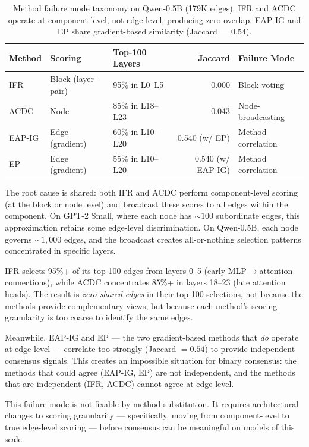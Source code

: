\documentclass[11pt,a4paper]{article}
\begin{document}
\begin{table}[t]
\centering
\small
\caption{Method failure mode taxonomy on Qwen-0.5B (179K edges). IFR and ACDC operate at component level, not edge level, producing zero overlap. EAP-IG and EP share gradient-based similarity (Jaccard $= 0.54$).}
\label{tab:divergence}
\begin{tabular}{lllrl}
\toprule
\textbf{Method} & \textbf{Scoring} & \textbf{Top-100 Layers} & \textbf{Jaccard} & \textbf{Failure Mode} \\
\midrule
IFR    & Block (layer-pair) & 95\% in L0--L5    & 0.000 & Block-voting \\
ACDC   & Node               & 85\% in L18--L23  & 0.043 & Node-broadcasting \\
EAP-IG & Edge (gradient)    & 60\% in L10--L20  & 0.540 (w/ EP) & Method correlation \\
EP     & Edge (gradient)    & 55\% in L10--L20  & 0.540 (w/ EAP-IG) & Method correlation \\
\bottomrule
\end{tabular}
\end{table}

The root cause is shared: both IFR and ACDC perform component-level scoring (at the block or node level) and broadcast these scores to all edges within the component. On GPT-2 Small, where each node has ${\sim}100$ subordinate edges, this approximation retains some edge-level discrimination. On Qwen-0.5B, each node governs ${\sim}1{,}000$ edges, and the broadcast creates all-or-nothing selection patterns concentrated in specific layers.

IFR selects 95\%+ of its top-100 edges from layers 0--5 (early MLP$\to$attention connections), while ACDC concentrates 85\%+ in layers 18--23 (late attention heads). The result is \emph{zero shared edges} in their top-100 selections, not because the methods provide complementary views, but because each method's scoring granularity is too coarse to identify the same edges.

Meanwhile, EAP-IG and EP --- the two gradient-based methods that \emph{do} operate at edge level --- correlate too strongly (Jaccard $= 0.54$) to provide independent consensus signals. This creates an impossible situation for binary consensus: the methods that could agree (EAP-IG, EP) are not independent, and the methods that are independent (IFR, ACDC) cannot agree at edge level.

This failure mode is not fixable by method substitution. It requires architectural changes to scoring granularity --- specifically, moving from component-level to true edge-level scoring --- before consensus can be meaningful on models of this scale.
\end{document}
